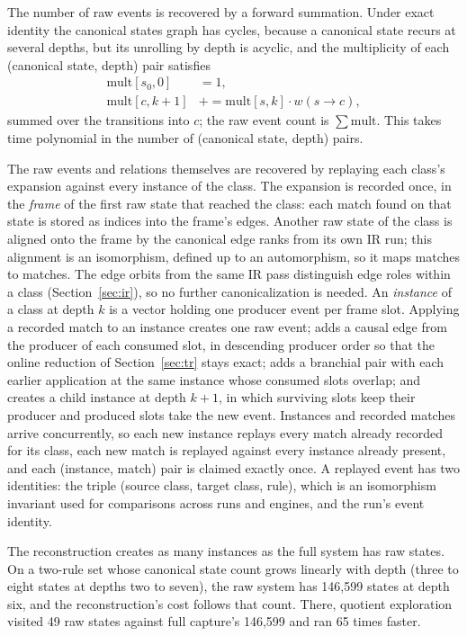 The number of raw events is recovered by a forward summation. Under exact identity the canonical
states graph has cycles, because a canonical state recurs at several depths, but its unrolling by
depth is acyclic, and the multiplicity of each (canonical state, depth) pair satisfies
\begin{align}
  \mathrm{mult}[s_0, 0] &= 1, \nonumber\\
  \mathrm{mult}[c, k{+}1] &\mathrel{+}= \mathrm{mult}[s, k]\cdot w(s \to c),
  \label{eq:mult}
\end{align}
summed over the transitions into $c$; the raw event count is $\sum \mathrm{mult}$. This takes time
polynomial in the number of (canonical state, depth) pairs.

The raw events and relations themselves are recovered by replaying each class's expansion against
every instance of the class. The expansion is recorded once, in the \emph{frame} of the first raw
state that reached the class: each match found on that state is stored as indices into the frame's
edges. Another raw state of the class is aligned onto the frame by the canonical edge ranks from
its own IR run; this alignment is an isomorphism, defined up to an automorphism, so it maps matches
to matches. The edge orbits from the same IR pass distinguish edge roles within a class
(Section~\ref{sec:ir}), so no further canonicalization is needed. An \emph{instance} of a class at
depth $k$ is a vector holding one producer event per frame slot. Applying a recorded match to an
instance creates one raw event; adds a causal edge from the producer of each consumed slot, in
descending producer order so that the online reduction of Section~\ref{sec:tr} stays exact; adds a
branchial pair with each earlier application at the same instance whose consumed slots overlap;
and creates a child instance at depth $k+1$, in which surviving slots keep their producer and
produced slots take the new event. Instances and recorded matches arrive concurrently, so each new
instance replays every match already recorded for its class, each new match is replayed against
every instance already present, and each (instance, match) pair is claimed exactly once. A replayed
event has two identities: the triple (source class, target class, rule), which is an isomorphism
invariant used for comparisons across runs and engines, and the run's event identity.

The reconstruction creates as many instances as the full system has raw states. On a two-rule set
whose canonical state count grows linearly with depth (three to eight states at depths two to
seven), the raw system has 146,599 states at depth six, and the reconstruction's cost follows that
count. There, quotient exploration visited 49 raw states against full capture's 146,599 and ran 65
times faster.

